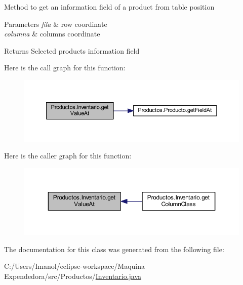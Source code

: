 Method to get an information field of a product from table position 
\begin{DoxyParams}{Parameters}
{\em fila} & row coordinate \\
\hline
{\em columna} & columns coordinate \\
\hline
\end{DoxyParams}
\begin{DoxyReturn}{Returns}
Selected product\textquotesingle{}s information field 
\end{DoxyReturn}
Here is the call graph for this function\+:
\nopagebreak
\begin{figure}[H]
\begin{center}
\leavevmode
\includegraphics[width=350pt]{class_productos_1_1_inventario_a79bccc9036dee4d92518ea4b21b3de3d_cgraph}
\end{center}
\end{figure}
Here is the caller graph for this function\+:
\nopagebreak
\begin{figure}[H]
\begin{center}
\leavevmode
\includegraphics[width=350pt]{class_productos_1_1_inventario_a79bccc9036dee4d92518ea4b21b3de3d_icgraph}
\end{center}
\end{figure}


The documentation for this class was generated from the following file\+:\begin{DoxyCompactItemize}
\item 
C\+:/\+Users/\+Imanol/eclipse-\/workspace/\+Maquina Expendedora/src/\+Productos/\mbox{\hyperlink{_inventario_8java}{Inventario.\+java}}\end{DoxyCompactItemize}
